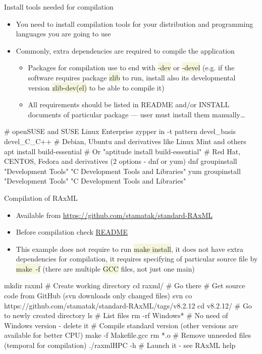 \documentclass[compress, xelatex, 11pt, xcolor=svgnames, aspectratio=169,
	hyperref={
		bookmarks=true,
		unicode=true,
		colorlinks=true,
		pdftitle={Linux, command line and MetaCentrum},
		plainpages=false,
		pdfauthor={Vojtech Zeisek},
		pdfsubject={Course about use of Linux command line, writing shell scripts and using MetaCentrum of CESNET},
		pdfcreator={XeLaTeX},
		pdfkeywords={Linux, GNU, BASH, shell, command line, MetaCentrum},
		linkcolor=DarkRed, %
		anchorcolor=DarkBlue, %
		citecolor=Indigo, %
		filecolor=NavyBlue, %
		menucolor=DarkMagenta, %
		urlcolor=DarkBlue, %
		},
	url={hyphens, lowtilde} %
	]{beamer}
\renewcommand{\texttt}[1]{\colorbox{Beige}{{\ttfamily #1}}}
\begin{document}
\begin{frame}[fragile]{Install tools needed for compilation}
	\begin{itemize}
		\item You need to install compilation tools for your distribution and programming languages you are going to use
		\item Commonly, extra dependencies are required to compile the application
		\begin{itemize}
			\item Packages for compilation use to end with \texttt{-dev} or \texttt{-devel} (e.g. if the software requires package \texttt{zlib} to run, install also its developmental version \texttt{zlib-dev(el)} to be able to compile it)
			\item All requirements should be listed in README and/or INSTALL documents of particular package --- user must install them manually\ldots
		\end{itemize}
	\end{itemize}
	\vfill
	\begin{bashcode}
    # openSUSE and SUSE Linux Enterprise
    zypper in -t pattern devel_basis devel_C_C++
    # Debian, Ubuntu and derivatives like Linux Mint and others
    apt install build-essential # Or "aptitude install build-essential"
    # Red Hat, CENTOS, Fedora and derivatives (2 options - dnf or yum)
    dnf groupinstall "Development Tools" "C Development Tools and Libraries"
    yum groupinstall "Development Tools" "C Development Tools and Libraries"
	\end{bashcode}
\end{frame}

\begin{frame}[fragile]{Compilation of RAxML} %
	\begin{itemize}
		\item Available from \url{https://github.com/stamatak/standard-RAxML}
		\item Before compilation check \href{https://github.com/stamatak/standard-RAxML/blob/master/README.md}{README}
		\item This example does not require to run \texttt{make install}, it does not have extra dependencies for compilation, it requires specifying of particular source file by \texttt{make~-f} (there are multiple \texttt{GCC} files, not just one main)
	\end{itemize}
	\begin{bashcode}
    mkdir raxml # Create working directory
    cd raxml/ # Go there
    # Get source code from GitHub (svn downloads only changed files)
    svn co https://github.com/stamatak/standard-RAxML/tags/v8.2.12
    cd v8.2.12/ # Go to newly created directory
    ls # List files
    rm -rf Windows* # No need of Windows version - delete it
    # Compile standard version (other versions are available for better CPU)
    make -f Makefile.gcc
    rm *.o # Remove unneeded files (temporal for compilation)
    ./raxmlHPC -h # Launch it - see RAxML help
	\end{bashcode}
\end{frame}
\end{document}
